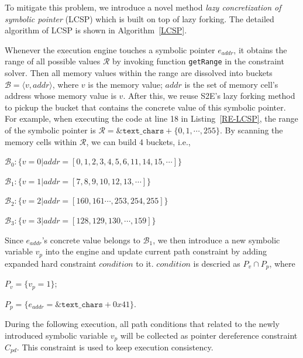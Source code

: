 \documentclass{cta-author}
\begin{document}
To mitigate this problem, we introduce a novel method 
\emph{lazy concretization of symbolic pointer} (LCSP) 
which is built on top of lazy forking. The detailed algorithm 
of LCSP is shown in Algorithm~\ref{LCSP}.


 

Whenever the execution engine touches a symbolic pointer $e_{addr}$, it obtains 
the range of all possible values $\mathcal{R}$ by invoking function \texttt{getRange} 
in the constraint solver. Then all memory values within the range are dissolved
into buckets $\mathcal{B}=\langle v, addr\rangle$, where $v$ is the memory value; $addr$
is the set of memory cell's address whose memory value is $v$.
After this, we reuse S2E's lazy forking method to pickup 
the bucket that contains the concrete value of this symbolic pointer.
For example, when executing the code at line 18 in Listing~\ref{RE-LCSP}, the range of 
the symbolic pointer is $\mathcal{R}=\texttt{\&text\_chars}+\{0, 1,\cdots, 255\}$.
By scanning the memory cells within $\mathcal{R}$, we can build 4 buckets, i.e., 

$\mathcal{B}_0:\{v=0| addr=[0,1,2,3,4,5,6,11,14,15,\cdots]\}$

$\mathcal{B}_1:\{v=1| addr=[7,8,9,10,12,13,\cdots]\}$

$\mathcal{B}_2:\{v=2| addr=[160,161\cdots, 253,254,255]\}$

$\mathcal{B}_3:\{v=3| addr=[128,129,130,\cdots,159]\}$

Since $e_{addr}$'s concrete value belongs to $\mathcal{B}_1$, we then
introduce a new symbolic variable $v_p$ into the engine and update current path constraint by adding expanded hard constraint $condition$ to it. 
$condition$ is descried as $P_v\cap P_p$, where


$P_v=\{v_p=1\}$; 

$P_p=\{e_{addr}=\&\texttt{text\_chars}+0x41\}$.

During the following execution, all path conditions that related to the newly
introduced symbolic variable $v_p$ will be collected as pointer dereference constraint
$C_{pd}$.
This constraint is used to keep execution consistency.
\end{document}
